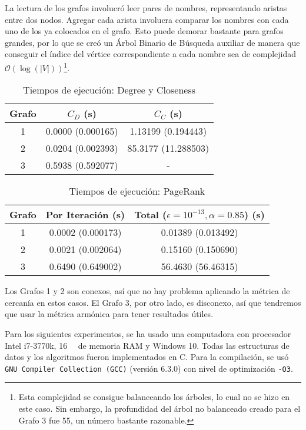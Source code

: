 \documentclass[journal]{IEEEtran}
\let\MYoriglatexcaption\caption
\renewcommand{\caption}[2][\relax]{\MYoriglatexcaption[#2]{#2}}
\newcommand{\pkg}[1]{\texttt{#1}}
\begin{document}
La lectura de los grafos involucró leer pares de nombres, representando aristas entre dos nodos. Agregar cada arista involucra comparar los nombres con cada uno de los ya colocados en el grafo. Esto puede demorar bastante para grafos grandes, por lo que se creó un Árbol Binario de Búsqueda auxiliar de manera que conseguir el índice del vértice correspondiente a cada nombre sea de complejidad \(\mathcal{O}(\log(|V|))\)\footnote{Esta complejidad se consigue balanceando los árboles, lo cual no se hizo en este caso. Sin embargo, la profundidad del árbol no balanceado creado para el Grafo 3 fue 55, un número bastante razonable.}.

\begin{table}[t]
	\renewcommand{\arraystretch}{1.3}
	\caption{Tiempos de ejecución: Degree y Closeness}
	\label{tab:tejecucion}
	\centering
	\begin{tabular}{c|c|c}
		\hline
		Grafo & \(C_D\) (s) & \(C_C\) (s) \\
		\hline\hline
		1 & 0.0000 (0.000165) & 1.13199 (0.194443) \\
		2 & 0.0204 (0.002393) & 85.3177 (11.288503) \\
		3 & 0.5938 (0.592077) & - \\
		\hline
	\end{tabular}
\end{table}

\begin{table}[t]
	\renewcommand{\arraystretch}{1.3}
	\caption{Tiempos de ejecución: PageRank}
	\label{tab:tpagerank}
	\centering
	\begin{tabular}{c|c|c}
		\hline
		Grafo & Por Iteración (s) & Total (\( \epsilon = 10^{-13}, \alpha = 0.85 \)) (s) \\
		\hline\hline
		1 & 0.0002 (0.000173) & 0.01389 (0.013492) \\
		2 & 0.0021 (0.002064) & 0.15160 (0.150690) \\
		3 & 0.6490 (0.649002) & 56.4630 (56.46315) \\
		\hline
	\end{tabular}
\end{table}

Los Grafos 1 y 2 son conexos, así que no hay problema aplicando la métrica de cercanía en estos casos. El Grafo 3, por otro lado, es disconexo, así que tendremos que usar la métrica armónica para tener resultados útiles.

Para los siguientes experimentos, se ha usado una computadora con procesador Intel i7-3770k, \SI{16}{\giga\byte} de memoria RAM y Windows 10. Todas las estructuras de datos y los algoritmos fueron implementados en C. Para la compilación, se usó \pkg{GNU Compiler Collection (GCC)} (versión 6.3.0) con nivel de optimización \texttt{-O3}.
\end{document}

